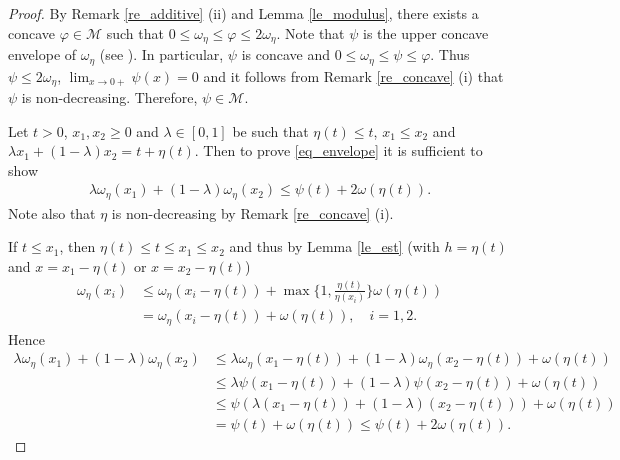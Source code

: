 \documentclass[10pt,a4paper]{amsart}
\theoremstyle{definition}
\newcommand{\M}{\mathcal{M}}
\begin{document}
\begin{proof}
By Remark \ref{re_additive} (ii) and Lemma \ref{le_modulus}, there exists a concave $ \varphi\in\M $ such that $ 0\leq\omega_{\eta}\leq\varphi\leq 2\omega_{\eta} $. Note that $ \psi $ is the upper concave envelope of $ \omega_{\eta} $ (see \cite[Corollary 17.1.5]{R}). In particular, $ \psi $ is concave and $ 0\leq\omega_{\eta}\leq\psi\leq\varphi $. Thus $ \psi\leq 2\omega_{\eta} $, $ \lim_{x\to 0+}\psi(x)=0 $ and it follows from Remark \ref{re_concave} (i) that $ \psi $ is non-decreasing. Therefore, $ \psi\in\M $.

Let $ t>0 $, $ x_1,x_2\geq 0 $ and $ \lambda\in[0,1] $ be such that $ \eta(t)\leq t $, $ x_1\leq x_2 $ and $ \lambda x_1+(1-\lambda)x_2=t+\eta(t) $. Then to prove \eqref{eq_envelope} it is sufficient to show
\begin{align*}
\lambda\omega_{\eta}(x_1)+(1-\lambda)\omega_{\eta}(x_2)\leq\psi(t)+2\omega(\eta(t)).
\end{align*}
Note also that $ \eta $ is non-decreasing by Remark \ref{re_concave} (i).

If $ t\leq x_1 $, then $ \eta(t)\leq t\leq x_1\leq x_2 $ and thus by Lemma \ref{le_est} (with $ h=\eta(t) $ and $ x=x_1-\eta(t) $ or  $ x=x_2-\eta(t) $)
\begin{align*}
\omega_{\eta}(x_i)&\leq\omega_{\eta}(x_i-\eta(t))+\max\bigg\lbrace 1,\frac{\eta(t)}{\eta(x_i)}\bigg\rbrace\omega(\eta(t))\\
&=\omega_{\eta}(x_i-\eta(t))+\omega(\eta(t)),\quad i=1,2.
\end{align*}
Hence
\begin{align*}
\lambda\omega_{\eta}(x_1)+(1-\lambda)\omega_{\eta}(x_2)&\leq\lambda\omega_{\eta}(x_1-\eta(t))+(1-\lambda)\omega_{\eta}(x_2-\eta(t))+\omega(\eta(t))\\
&\leq\lambda\psi(x_1-\eta(t))+(1-\lambda)\psi(x_2-\eta(t))+\omega(\eta(t))\\
&\leq\psi(\lambda(x_1-\eta(t))+(1-\lambda)(x_2-\eta(t)))+\omega(\eta(t))\\
&=\psi(t)+\omega(\eta(t))\leq\psi(t)+2\omega(\eta(t)).
\end{align*}


\end{proof}
\end{document}

